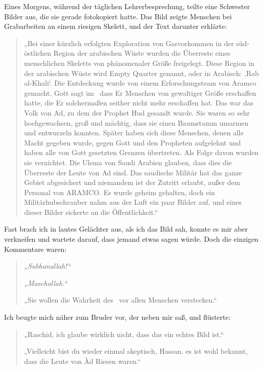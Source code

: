\documentclass[12pt]{memoir}
\begin{document}
Eines Morgens, während der täglichen Lehrerbesprechung,
teilte eine Schwester Bilder aus, die sie gerade fotokopiert hatte.
Das Bild zeigte Menschen bei Grabarbeiten an einem riesigen Skelett,
und der Text darunter erklärte:

\begin{quote}
„Bei einer kürzlich erfolgten Exploration von Gasvorkommen
in der süd-östlichen Region der arabischen Wüste
wurden die Überreste eines menschlichen Skeletts
von phänomenaler Größe freigelegt.
Diese Region in der arabischen Wüste wird Empty Quarter genannt,
oder in Arabisch: ‚Rab al-Khali‘.
Die Entdeckung wurde von einem Erforschungsteam von Aramco gemacht.
Gott sagt im \Quran\, dass Er Menschen von gewaltiger Größe erschaffen hatte,
die Er solchermaßen seither nicht mehr erschaffen hat.
Das war das Volk von Ad, zu dem der Prophet Hud gesandt wurde.
Sie waren so sehr hochgewachsen, groß und mächtig,
dass sie einen Baumstamm umarmen und entwurzeln konnten.
Später haben sich diese Menschen, denen alle Macht gegeben wurde,
gegen Gott und den Propheten aufgelehnt
und haben alle von Gott gesetzten Grenzen übertreten.
Als Folge davon wurden sie vernichtet.
Die Ulema von Saudi Arabien glauben,
dass dies die Überreste der Leute von Ad sind.
Das saudische Militär hat das ganze Gebiet abgesichert
und niemandem ist der Zutritt erlaubt, außer dem Personal von ARAMCO.
Es wurde geheim gehalten,
doch ein Militärhubschrauber nahm aus der Luft ein paar Bilder auf,
und eines dieser Bilder sickerte an die Öffentlichkeit.“
\end{quote}

Fast brach ich in lautes Gelächter aus, als ich das Bild sah,
konnte es mir aber verkneifen und wartete darauf,
dass jemand etwas sagen würde.
Doch die einzigen Kommentare waren:

\begin{quote}
\emph{„Subhanallah!“}

\emph{„Maschallah.“}

„Sie wollen die Wahrheit des \Quran\ vor allen Menschen verstecken.“
\end{quote}

Ich beugte mich näher zum Bruder vor, der neben mir saß, und flüsterte:

\begin{quote}
„Raschid, ich glaube wirklich nicht, dass das ein echtes Bild ist.“

„Vielleicht bist du wieder einmal skeptisch, Hassan.
es ist wohl bekannt, dass die Leute von \`Ad Riesen waren.“
\end{quote}
\end{document}
